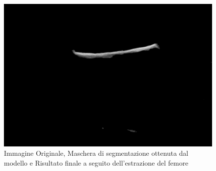 \begin{figure}[!ht]
\begin{minipage}{0.32\textwidth}
		\centering
		\includegraphics[width=\textwidth]{./Immagini/nuovo_ecografo_results/4_extracted_femur.png}
	\end{minipage}
	\caption{Immagine Originale, Maschera di segmentazione ottenuta dal modello e Risultato finale a seguito dell'estrazione del femore}
\end{figure}

